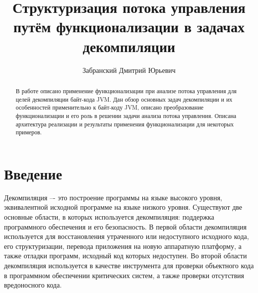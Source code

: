 

\lstset{
language=llang
}

\title{Структуризация потока управления путём функционализации в задачах декомпиляции}
%
\author{Забранский Дмитрий Юрьевич}
%
%
%

\maketitle              %

\begin{abstract}
В работе описано применение функционализации при анализе потока управления для целей декомпиляции байт-кода JVM.
Дан обзор основных задач декомпиляции и их особенностей применительно к байт-коду JVM, описано преобразование
функционализации и его роль в решении задачи анализа потока управления. Описана архитектура реализации и результаты
применения функционализации для некоторых примеров.
\end{abstract}
%



\section*{Введение}

Декомпиляция –- это построение программы на языке высокого уровня, эквивалентной исходной программе на языке низкого уровня. Существуют две основные области, в которых используется декомпиляция: поддержка программного обеспечения и его безопасность. В первой области декомпиляция используется для восстановления утраченного или недоступного исходного кода, его структуризации, перевода приложения на новую аппаратную платформу, а также отладки программ, исходный код которых недоступен. Во второй области декомпиляция используется в качестве инструмента для проверки объектного кода в программном обеспечении критических систем, а также проверки отсутствия вредоносного кода.

